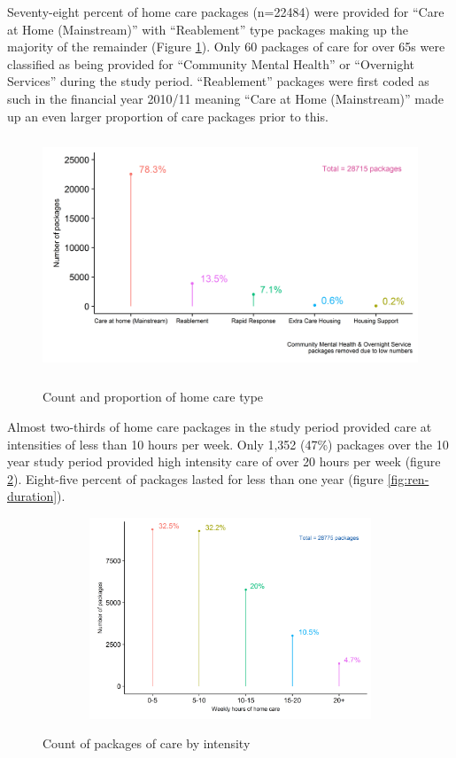 \documentclass[]{article}
\begin{document}
Seventy-eight percent of home care packages (n=22484) were provided for
``Care at Home (Mainstream)'' with ``Reablement'' type packages making
up the majority of the remainder (Figure \ref{fig:ren-type}). Only 60
packages of care for over 65s were classified as being provided for
``Community Mental Health'' or ``Overnight Services'' during the study
period. ``Reablement'' packages were first coded as such in the
financial year 2010/11 meaning ``Care at Home (Mainstream)'' made up an
even larger proportion of care packages prior to this.

\begin{figure}[]
  \centering
    \caption{Count and proportion of home care type}
    \includegraphics[height = 7cm, width = 12cm]{figures/chapter-renf/02-pack-plot}
    \label{fig:ren-type}
\end{figure}

Almost two-thirds of home care packages in the study period provided
care at intensities of less than 10 hours per week. Only 1,352 (47\%)
packages over the 10 year study period provided high intensity care of
over 20 hours per week (figure \ref{fig:ren-hrs}). Eight-five percent of
packages lasted for less than one year (figure \ref{fig:ren-duration}).

\begin{figure}[h]
  \centering
    \caption{Count of packages of care by intensity}
    \includegraphics[height = 6cm, width = 14cm]{figures/chapter-renf/03-hrs-plot-ts-subset.png}
    \label{fig:ren-hrs}
\end{figure}
\end{document}
